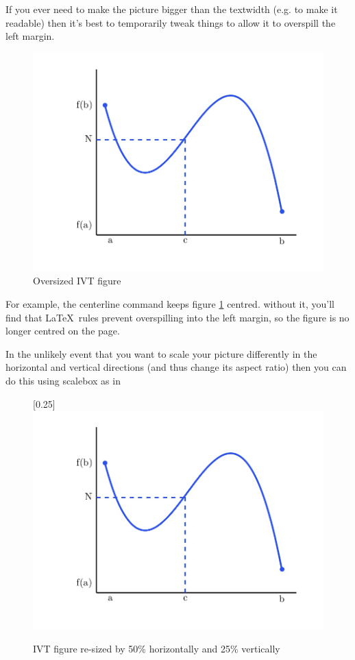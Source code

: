 \documentclass[a4paper,11pt]{article}
\begin{document}
If you ever need to make the picture bigger than the textwidth (e.g. to make it readable) then it's best to temporarily tweak things to allow it to overspill the left margin.
%
\begin{figure}[hbtp]
	\centering %
	\centerline{     %
	\includegraphics[width=1.7\textwidth]{IVT.jpg}
	}
	\caption{Oversized IVT figure}
	\label{fig:IVTtoobig}
\end{figure}
%
For example,  the centerline command keeps figure \ref{fig:IVTtoobig} centred. without it, you'll find that \LaTeX\ rules prevent overspilling into the left margin, so the figure is no longer centred on the page.

In the unlikely event that you want to scale your picture differently in the horizontal and vertical directions (and thus change its aspect ratio) then you can do this using scalebox as in
%
\begin{figure}[hbtp]
	\centering %
	\scalebox{0.5}[0.25]{  %
	\includegraphics{IVT.jpg}
	}
	\caption{IVT figure re-sized by 50\% horizontally and 25\% vertically}
	\label{fig:IVTskewed}
\end{figure}
%
\end{document}

